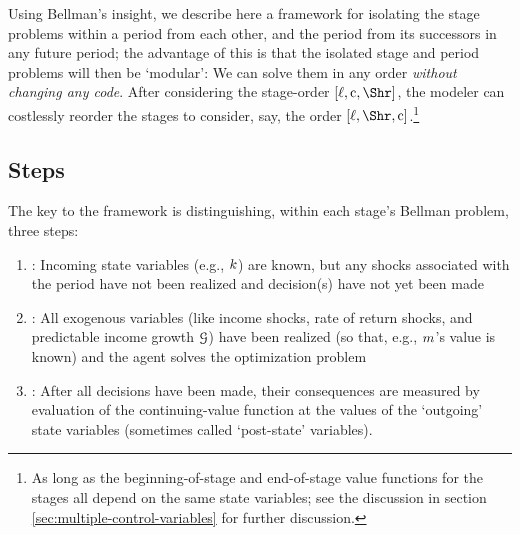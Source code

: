 Using Bellman's insight, we describe here a framework for isolating the {stage} problems within a {period} from each other, and the {period} from its successors in any future {period}; the advantage of this is that the isolated {stage} and {period} problems will then be `modular': We can solve them in any order \textit{without changing any code}. After considering the {stage}-order $[\ell,\cFunc,\Shr]$, the modeler can costlessly reorder the {stage}s to consider, say, the order $[\ell,\Shr,\cFunc]$.\footnote{As long as the beginning-of-{stage} and end-of-{stage} value functions for the {stage}s all depend on the same state variables; see the discussion in section \ref{sec:multiple-control-variables} for further discussion.}

\subsection{Steps}

The key to the framework is distinguishing, within each {stage}'s Bellman problem, three {steps}:

\begin{enumerate}
\item \textbf{\Arrival}: Incoming state variables (e.g., $k$) are known, but any shocks associated with the period have not been realized and decision(s) have not yet been made
\item \textbf{\Decision}: All exogenous variables (like income shocks, rate of return shocks, and predictable income growth $\mathcal{G}$) have been realized (so that, e.g., $m$'s value is known) and the agent solves the optimization problem
\item \textbf{\Continuation}: After all decisions have been made, their consequences are measured by evaluation of the continuing-value function at the values of the `outgoing' state variables (sometimes called `post-state' variables).
\end{enumerate}


